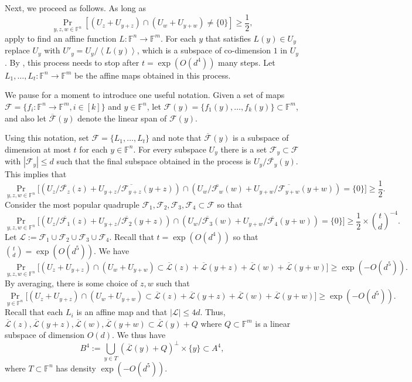 \documentclass[12pt]{article}
\newcommand{\F}{\mathbb{F}}
\newcommand{\LL}{\mathcal{L}}
\newcommand{\FF}{\mathcal{F}}
\begin{document}
Next, we proceed as follows. As long as
$$
\Pr_{y,z,w \in \F^n}\left [ \left( U_{z} + U_{y+z} \right) \cap \left( U_{w} + U_{y+w} \right) \ne \{0\} \right] \ge  \frac{1}{2},
$$
apply  to find an affine function $L:\F^n \to \F^m$. For each
$y$ that satisfies $L(y) \in U_y$ replace $U_y$ with $U'_y = U_y / \left< L(y) \right>$, which
is a subspace of co-dimension $1$ in $U_y$. By , this process needs to stop after $t=\exp(O(d^4))$ many steps.
Let $L_1,\ldots,L_t:\F^n \to \F^m$ be the affine maps obtained in this process.

We pause for a moment to introduce one useful notation.
Given a set of maps $\FF = \{f_i:\F^n\rightarrow \F^m, i\in [k]\}$ and $y\in \F^n$, let $\FF(y) = \{ f_1(y),\dots,f_k(y)\} \subset \F^m$, and also let $\overline{\FF}(y)$ denote the linear span of $\FF(y)$.


Using this notation, set $\FF = \{L_1,\ldots,L_t\}$ and note that $\overline{\FF}(y) $ is a subspace of dimension at most $t$ for each $y\in \F^n$.
%
For every subspace $U_y$ there is a set $\FF_y \subset \FF$ with $|\FF_y| \leq d$ such that
the final subspace obtained in the process is $U_y / \overline{\FF_{y}}(y)$.
This implies that
$$
\Pr_{y,z,w \in \F^n} \bigg[ \left( U_{z}/\overline{\FF_{z}}(z) + U_{y+z}/\overline{\FF_{y+z}}(y+z)   \right) \cap \left( U_{w}/\overline{\FF_{w}}(w)    + U_{y+w}/\overline{\FF_{y+w}}(y+w)     \right) = \{0\} \bigg] \ge  \frac{1}{2}.
$$	
Consider the most popular quadruple $\FF_1,\FF_2,\FF_3,\FF_4\subset \FF$ so that
$$
\Pr_{y,z,w \in \F^n} \bigg[ \left( U_{z}/\overline{\FF_{1}}(z) + U_{y+z}/\overline{\FF_{2}}(y+z)   \right) \cap \left( U_{w}/\overline{\FF_{3}}(w) + U_{y+w}/\overline{\FF_{4}}(y+w)   \right) = \{0\} \bigg] \ge \frac{1}{2} \times {t \choose d}^{-4}.
$$
Let $\LL := \FF_1 \cup \FF_2 \cup \FF_3 \cup \FF_4$. Recall that $t=\exp(O(d^4))$ so that ${t \choose d} = \exp(O(d^5))$.
We have
$$
\Pr_{y,z,w\in \F^n} \bigg[ \left( U_{z}+ U_{y+z} \right) \cap \left( U_{w} + U_{y+w} \right) \subset \overline{\LL}(z) + \overline{\LL}(y+z) + \overline{\LL}(w) +\overline{\LL}(y+w)   \bigg] \ge \exp(-O(d^5)).
$$
By averaging, there is some choice of $z,w$ such that
$$
\Pr_{y\in \F^n} \bigg[ \left( U_{z}+ U_{y+z} \right) \cap \left( U_{w} + U_{y+w} \right) \subset\overline{\LL}(z) + \overline{\LL}(y+z) + \overline{\LL}(w) +\overline{\LL}(y+w)   \bigg]   \ge \exp(-O(d^5)).
$$
Recall that each $L_i$ is an affine map and that $|\LL|\leq 4d$. Thus, $\overline{\LL}(z) , \overline{\LL}(y+z) , \overline{\LL}(w) ,\overline{\LL}(y+w)\subset \overline{\LL}(y)+ Q$
where $Q \subset \F^m$ is a linear subspace of dimension $O(d)$. We thus have
$$
B^4 := \bigcup_{y\in T} (\overline{\LL}(y)+Q)^\perp \times \{y\} \subset A^4,
$$
where $T \subset \F^n$ has density $\exp(-O(d^5))$.
\end{document}
